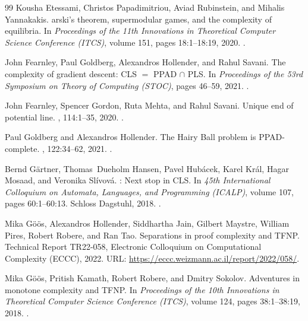 \documentclass[10pt,a4paper]{article}
\def\cap{∩ }
\theoremstyle{definition}
\theoremstyle{plain}
\theoremstyle{remark}
\begin{document}
\begin{thebibliography}{99}
Kousha Etessami, Christos Papadimitriou, Aviad Rubinstein, and Mihalis
  Yannakakis.
arski’s theorem, supermodular games, and the complexity of
  equilibria.
\newblock In {\em Proceedings of the 11th Innovations in Theoretical Computer
  Science Conference (ITCS)}, volume 151, pages 18:1--18:19, 2020.
\newblock \href {https://doi.org/10.4230/LIPIcs.ITCS.2020.18}
  {}.

John Fearnley, Paul Goldberg, Alexandros Hollender, and Rahul Savani.
\newblock The complexity of gradient descent: {CLS} $=$ {PPAD} $\cap$ {PLS}.
\newblock In {\em Proceedings of the 53rd Symposium on Theory of Computing
  (STOC)}, pages 46--59, 2021.
\newblock \href {https://doi.org/10.1145/3406325.3451052}
  {}.

John Fearnley, Spencer Gordon, Ruta Mehta, and Rahul Savani.
\newblock Unique end of potential line.
, 114:1--35, 2020.
\newblock \href {https://doi.org/10.1016/j.jcss.2020.05.007}
  {}.

Paul Goldberg and Alexandros Hollender.
\newblock The {H}airy {B}all problem is {PPAD}-complete.
, 122:34--62, 2021.
\newblock \href {https://doi.org/10.1016/j.jcss.2021.05.004}
  {}.

Bernd G{\"a}rtner, Thomas~Dueholm Hansen, Pavel Hub{\'a}cek, Karel Kr{\'a}l,
  Hagar Mosaad, and Veronika Sl{\'i}vov{\'a}.
: Next stop in {CLS}.
\newblock In {\em 45th International Colloquium on Automata, Languages, and
  Programming (ICALP)}, volume 107, pages 60:1--60:13. Schloss Dagstuhl, 2018.
\newblock \href {https://doi.org/10.4230/LIPICS.ICALP.2018.60}
  {}.

Mika G\"o\"os, Alexandros Hollender, Siddhartha Jain, Gilbert Maystre, William
  Pires, Robert Robere, and Ran Tao.
\newblock Separations in proof complexity and {TFNP}.
\newblock Technical Report TR22-058, Electronic Colloquium on Computational
  Complexity (ECCC), 2022.
\newblock URL: \url{https://eccc.weizmann.ac.il/report/2022/058/}.

Mika G{\"o}{\"o}s, Pritish Kamath, Robert Robere, and Dmitry Sokolov.
\newblock Adventures in monotone complexity and {TFNP}.
\newblock In {\em Proceedings of the 10th Innovations in Theoretical Computer
  Science Conference (ITCS)}, volume 124, pages 38:1--38:19, 2018.
\newblock \href {https://doi.org/10.4230/LIPIcs.ITCS.2019.38}
  {}.


\end{thebibliography}
\end{document}
